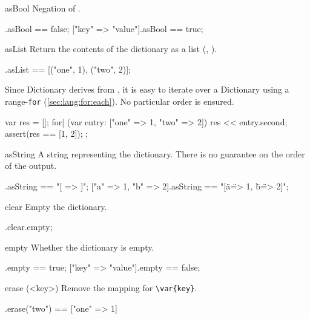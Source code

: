 \begin{urbiscriptapi}
\item[asBool]
  Negation of .
\begin{urbiassert}
[=>].asBool == false;
["key" => "value"].asBool == true;
\end{urbiassert}

\item[asList]
  Return the contents of the dictionary as a  list
  (, ).

\begin{urbiassert}
["one" => 1, "two" => 2].asList == [("one", 1), ("two", 2)];
\end{urbiassert}

  \noindent
  Since Dictionary derives from , it is easy
  to iterate over a Dictionary using a range-\lstinline|for|
  (\autoref{sec:lang:for:each}).  No particular order is ensured.
\begin{urbiscript}
{
  var res = [];
  for| (var entry: ["one" => 1, "two" => 2])
    res << entry.second;
  assert(res == [1, 2]);
};
\end{urbiscript}

\item[asString] A string representing the dictionary.  There is no guarantee
  on the order of the output.
\begin{urbiassert}
                [=>].asString == "[ => ]";
["a" => 1, "b" => 2].asString == "[\"a\" => 1, \"b\" => 2]";
\end{urbiassert}

\item[clear]
  Empty the dictionary.

\begin{urbiassert}
["one" => 1].clear.empty;
\end{urbiassert}

\item[empty]
  Whether the dictionary is empty.

\begin{urbiassert}
[=>].empty == true;
["key" => "value"].empty == false;
\end{urbiassert}

\item[erase](<key>)
  Remove the mapping for \lstinline|\var{key}|.

\begin{urbiassert}
["one" => 1, "two" => 2].erase("two") == ["one" => 1]
\end{urbiassert}


\end{urbiscriptapi}
